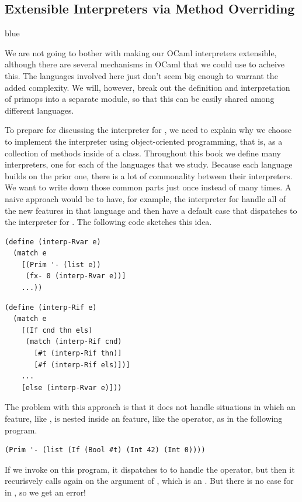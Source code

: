 \documentclass[11pt]{book}
\newenvironment{ocamlx}{
  \begin{color}{blue}
}
{
  \end{color}
}
\begin{document}
\subsection{Extensible Interpreters via Method Overriding}
\label{sec:extensible-interp}

\begin{ocamlx}
  We are not going to bother with making our OCaml interpreters
  extensible, although there are several mechanisms in OCaml that
  we could use to acheive this. The languages involved here just
  don't seem big enough to warrant the added complexity.
  We will, however, break out the definition and interpretation of
  primops into a separate module, so that this can be easily shared among
  different languages.
\end{ocamlx}

To prepare for discussing the interpreter for \LangVar{}, we need to
explain why we choose to implement the interpreter using
object-oriented programming, that is, as a collection of methods
inside of a class. Throughout this book we define many interpreters,
one for each of the languages that we study. Because each language
builds on the prior one, there is a lot of commonality between their
interpreters. We want to write down those common parts just once
instead of many times. A naive approach would be to have, for example,
the interpreter for \LangIf{} handle all of the new features in that
language and then have a default case that dispatches to the
interpreter for \LangVar{}. The following code sketches this idea.
\begin{center}
  \begin{minipage}{0.45\textwidth}
\begin{lstlisting}
(define (interp-Rvar e)
  (match e
    [(Prim '- (list e))
     (fx- 0 (interp-Rvar e))]
    ...))
\end{lstlisting}
\end{minipage}
\begin{minipage}{0.45\textwidth}
  \begin{lstlisting}
(define (interp-Rif e)
  (match e
    [(If cnd thn els)
     (match (interp-Rif cnd)
       [#t (interp-Rif thn)]
       [#f (interp-Rif els)])]
    ...
    [else (interp-Rvar e)]))    
\end{lstlisting}
\end{minipage}
\end{center}
The problem with this approach is that it does not handle situations
in which an \LangIf{} feature, like , is nested inside an \LangVar{}
feature, like the \code{-} operator, as in the following program.
\begin{lstlisting}
(Prim '- (list (If (Bool #t) (Int 42) (Int 0))))
\end{lstlisting}
If we invoke  on this program, it dispatches to
 to handle the \code{-} operator, but then it
recurisvely calls  again on the argument of \code{-},
which is an .  But there is no case for  in
, so we get an error!
\end{document}
